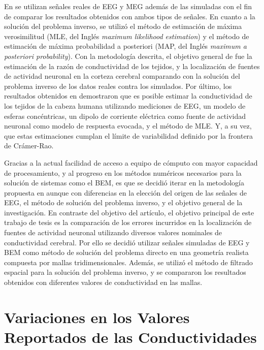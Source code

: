 En \cite{Gutierrez2004} se utilizan señales reales de EEG y MEG además de las simuladas con el fin de comparar los resultados obtenidos con ambos tipos de señales.
En cuanto a la solución del problema inverso, se utilizó el método de estimación de máxima verosimilitud (MLE, del Inglés \emph{maximum likelihood estimation}) y el método de estimación de máxima probabilidad a posteriori (MAP, del Inglés \emph{maximum a posteriori probability}).
Con la metodología descrita, el objetivo general de \cite{Gutierrez2004} fue la estimación de la razón de conductividad de los tejidos, y la localización de fuentes de actividad neuronal en la corteza cerebral comparando con la solución del problema inverso de los datos reales contra los simulados.
Por último, los resultados obtenidos en \cite{Gutierrez2004} demostraron que es posible estimar la conductividad de los tejidos de la cabeza humana utilizando mediciones de EEG, un modelo de esferas concéntricas, un dipolo de corriente eléctrica como fuente de actividad neuronal como modelo de respuesta evocada, y el método de MLE.
Y, a su vez, que estas estimaciones cumplan el límite de variabilidad definido por la frontera de Crámer-Rao.

Gracias a la actual facilidad de acceso a equipo de cómputo con mayor capacidad de procesamiento, y al progreso en los métodos numéricos necesarios para la solución de sistemas como el BEM, es que se decidió iterar en la metodología propuesta en \cite{Gutierrez2004} aunque con diferencias en la elección del origen de las señales de EEG, el método de solución del problema inverso, y el objetivo general de la investigación.
En contraste del objetivo del artículo, el objetivo principal de este trabajo de tesis es la comparación de los errores incurridos en la localización de fuentes de actividad neuronal utilizando diversos valores nominales de conductividad cerebral. 
Por ello se decidió utilizar señales simuladas de EEG y BEM como método de solución del problema directo en una geometría realista compuesta por mallas tridimensionales.
Además, se utilizó el método de filtrado espacial para la solución del problema inverso, y se compararon los resultados obtenidos con diferentes valores de conductividad en las mallas.

\section{Variaciones en los Valores Reportados de las Conductividades}
\label{sec:related:mccann}

